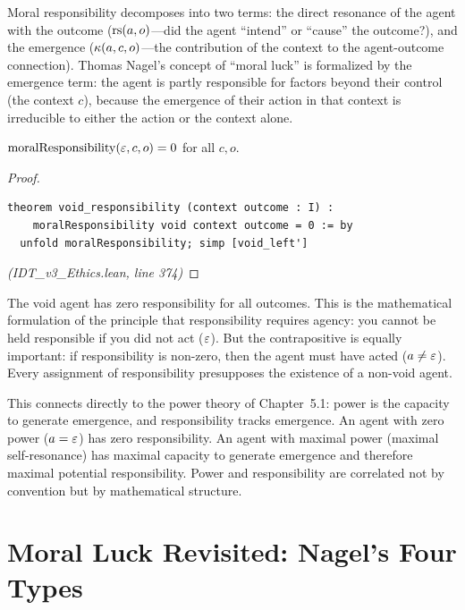 \begin{interpretation}
Moral responsibility decomposes into two terms: the direct resonance of the
agent with the outcome ($\mathrm{rs}(a,o)$---did the agent ``intend'' or ``cause'' the
outcome?), and the emergence ($\kappa(a,c,o)$---the contribution of the
context to the agent-outcome connection). Thomas Nagel's concept of ``moral
luck'' is formalized by the emergence term: the agent is partly responsible
for factors beyond their control (the context $c$), because the emergence of
their action in that context is irreducible to either the action or the context
alone.
\end{interpretation}

\begin{theorem}
\label{thm:void-responsibility}
$\mathrm{moralResponsibility}(\varepsilon, c, o) = 0$ for all $c, o$.
\end{theorem}

\begin{proof}
\begin{lstlisting}
theorem void_responsibility (context outcome : I) :
    moralResponsibility void context outcome = 0 := by
  unfold moralResponsibility; simp [void_left']
\end{lstlisting}
\textit{(IDT\_v3\_Ethics.lean, line 374)}
\end{proof}

\begin{interpretation}
The void agent has zero responsibility for all outcomes. This is the
mathematical formulation of the principle that responsibility requires agency:
you cannot be held responsible if you did not act ($\varepsilon$). But the
contrapositive is equally important: if responsibility is non-zero, then the
agent must have acted ($a \neq \varepsilon$). Every assignment of responsibility
presupposes the existence of a non-void agent.

This connects directly to the power theory of Chapter~5.1: power is the
capacity to generate emergence, and responsibility tracks emergence. An agent
with zero power ($a = \varepsilon$) has zero responsibility. An agent with maximal
power (maximal self-resonance) has maximal capacity to generate emergence and
therefore maximal potential responsibility. Power and responsibility are
correlated not by convention but by mathematical structure.
\end{interpretation}

\section{Moral Luck Revisited: Nagel's Four Types}
\label{sec:moral-luck-nagel}

